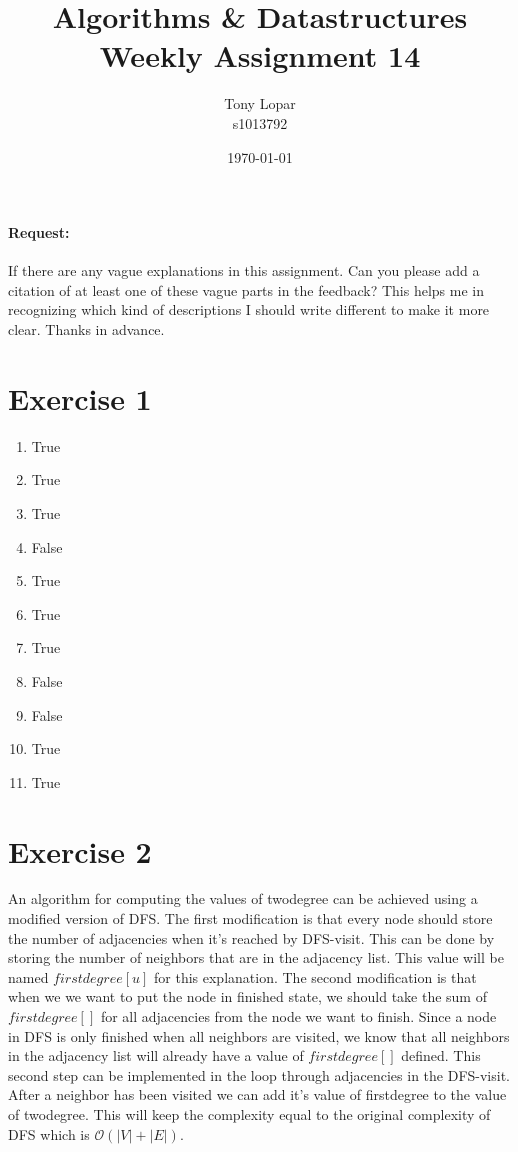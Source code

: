 \documentclass{article}
\newcommand{\bigO}{\mathcal{O}}
\begin{document}
\title{Algorithms \& Datastructures \\ Weekly Assignment 14}
\date{\today}
\author{Tony Lopar \\ s1013792}
\maketitle

\paragraph{Request:} If there are any vague explanations in this assignment. Can you please add a citation of at least one of these vague parts in the feedback? This helps me in recognizing which kind of descriptions I should write different to make it more clear. Thanks in advance.
\section*{Exercise 1}
\begin{enumerate}
  \item True
  \item True
  \item True
  \item False
  \item True
  \item True
  \item True
  \item False
  \item False
  \item True
  \item True
\end{enumerate}

\section*{Exercise 2}
An algorithm for computing the values of twodegree can be achieved using a modified version of DFS. The first modification is that every node should store the number of adjacencies when it's reached by DFS-visit. This can be done by storing the number of neighbors that are in the adjacency list. This value will be named $firstdegree[u]$ for this explanation. The second modification is that when we we want to put the node in finished state, we should take the sum of $firstdegree[]$ for all adjacencies from the node we want to finish. Since a node in DFS is only finished when all neighbors are visited, we know that all neighbors in the adjacency list will already have a value of $firstdegree[]$ defined. This second step can be implemented in the loop through adjacencies in the DFS-visit. After a neighbor has been visited we can add it's value of firstdegree to the value of twodegree. This will keep the complexity equal to the original complexity of DFS which is $\bigO (|V| + |E|)$.
\end{document}
